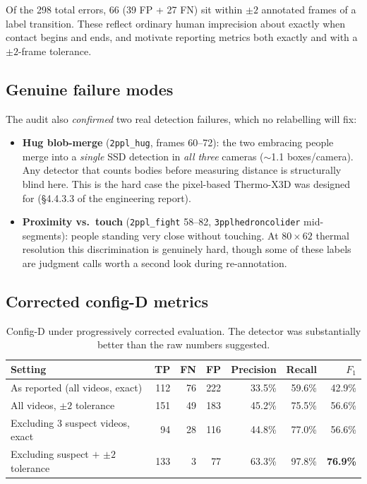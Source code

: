 \documentclass[11pt, a4paper]{article}
\begin{document}
Of the 298 total errors, 66 (39 FP + 27 FN) sit within $\pm2$ annotated frames of a
label transition. These reflect ordinary human imprecision about exactly when contact
begins and ends, and motivate reporting metrics both exactly and with a $\pm2$-frame
tolerance.

\subsection{Genuine failure modes}

The audit also \emph{confirmed} two real detection failures, which no relabelling will fix:

\begin{itemize}[itemsep=1pt]
    \item \textbf{Hug blob-merge} (\texttt{2ppl\_hug}, frames 60--72): the two embracing
    people merge into a \emph{single} SSD detection in \emph{all three} cameras
    ($\sim$1.1 boxes/camera). Any detector that counts bodies before measuring distance
    is structurally blind here. This is the hard case the pixel-based Thermo-X3D was
    designed for (\S4.4.3.3 of the engineering report).
    \item \textbf{Proximity vs.\ touch} (\texttt{2ppl\_fight} 58--82,
    \texttt{3pplhedroncolider} mid-segments): people standing very close without
    touching. At $80\times62$ thermal resolution this discrimination is genuinely hard,
    though some of these labels are judgment calls worth a second look during
    re-annotation.
\end{itemize}

\subsection{Corrected config-D metrics}

\begin{table}[H]
\centering
\small
\begin{tabular}{lrrrrrr}
\toprule
Setting & TP & FN & FP & Precision & Recall & $F_1$ \\
\midrule
As reported (all videos, exact)            & 112 & 76 & 222 & 33.5\% & 59.6\% & 42.9\% \\
All videos, $\pm2$ tolerance               & 151 & 49 & 183 & 45.2\% & 75.5\% & 56.6\% \\
Excluding 3 suspect videos, exact          &  94 & 28 & 116 & 44.8\% & 77.0\% & 56.6\% \\
\rowcolor{rowhi}
Excluding suspect $+$ $\pm2$ tolerance     & 133 &  3 &  77 & 63.3\% & 97.8\% & \textbf{76.9\%} \\
\bottomrule
\end{tabular}
\caption{Config-D under progressively corrected evaluation. The detector was
substantially better than the raw numbers suggested.}
\end{table}
\end{document}
